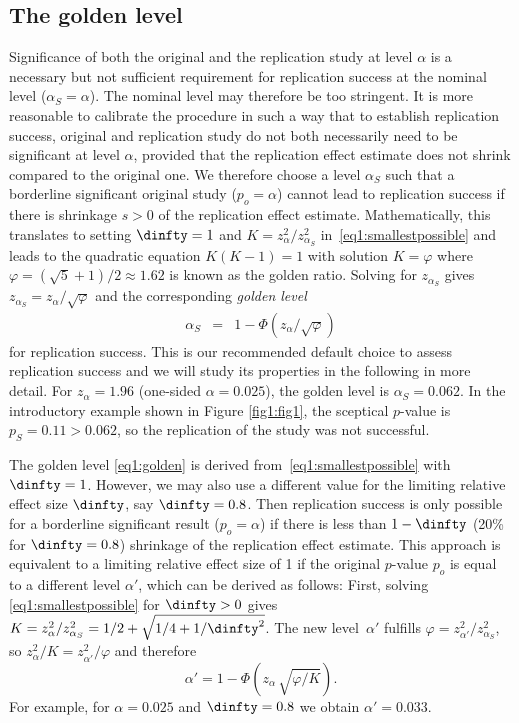\subsection{The golden level}\label{sec1:goldenthresh}
Significance of both the original and the replication study at level $\alpha$ is
a necessary but not sufficient requirement for replication success at the
nominal level ($\alpha_S = \alpha$). The nominal level may therefore be too
stringent. It is more reasonable to calibrate the procedure in such a way that
to establish replication success, original and replication study do not both
necessarily need to be significant at level $\alpha$, provided that the
replication effect estimate does not shrink compared to the original one. We
therefore choose a level $\alpha_S$ such that a borderline significant original
study ($p_o = \alpha$) cannot lead to replication success if there is shrinkage
$s > 0$ of the replication effect estimate. Mathematically, this translates to
setting $\dinfty = 1$ and \mbox{$K = z_\alpha^2/z_{\alpha_S}^2$}
in~\eqref{eq1:smallestpossible} and leads to the quadratic equation $K(K-1) = 1$
with solution $K = \varphi$ where \mbox{$\varphi = (\sqrt{5}+1)/2 \approx 1.62$}
is known as the golden ratio. Solving for $z_{\alpha_S}$ gives
$z_{\alpha_S} = z_\alpha / \sqrt{\varphi}$ and the corresponding \textit{golden
  level}
\begin{eqnarray}\label{eq1:golden}
\alpha_S & = & 1 -  \Phi(z_\alpha / \sqrt{\varphi} )
\end{eqnarray}
for replication success. This is our recommended default choice to assess
replication success and we will study its properties in the following in more
detail. For $z_\alpha = 1.96$ (one-sided $\alpha = 0.025$), the golden level is
$\alpha_S =0.062$. In the introductory example shown in Figure \ref{fig1:fig1},
the sceptical $p$-value is $p_S=0.11 > 0.062$, so the replication of the
\citet{Pyc2010} study was not successful.




The golden level \eqref{eq1:golden} is derived from~\eqref{eq1:smallestpossible}
with $\dinfty = 1$. However, we may also use a different value for the limiting
relative effect size $\dinfty$, say $\dinfty=0.8$. Then replication success is
only possible for a borderline significant result ($p_o = \alpha$) if there is
less than $1-\dinfty$ (20\% for \mbox{$\dinfty=0.8$}) shrinkage of the
replication effect estimate. This approach is equivalent to a limiting relative
effect size of 1 if the original $p$-value $p_o$ is equal to a different level
$\alpha'$, which can be derived as follows: First, solving
\eqref{eq1:smallestpossible} for $\dinfty > 0$ gives
$K = z_\alpha^2/z_{\alpha_S}^2 = 1/2+\sqrt{1/4 + 1/\dinfty^2}$. The new
level~$\alpha'$ fulfills $\varphi=z_{\alpha'}^2/z_{\alpha_S}^2$, so
$z_\alpha^2/K=z_{\alpha'}^2/\varphi$ and therefore
\begin{equation}\label{eq1:alphaPrime}
\alpha' = 1-\Phi\left(z_{\alpha} \, \sqrt{\varphi / K} \right).
\end{equation}
For example, for $\alpha = 0.025$ and $\dinfty = 0.8$ we obtain $\alpha'=0.033$.


